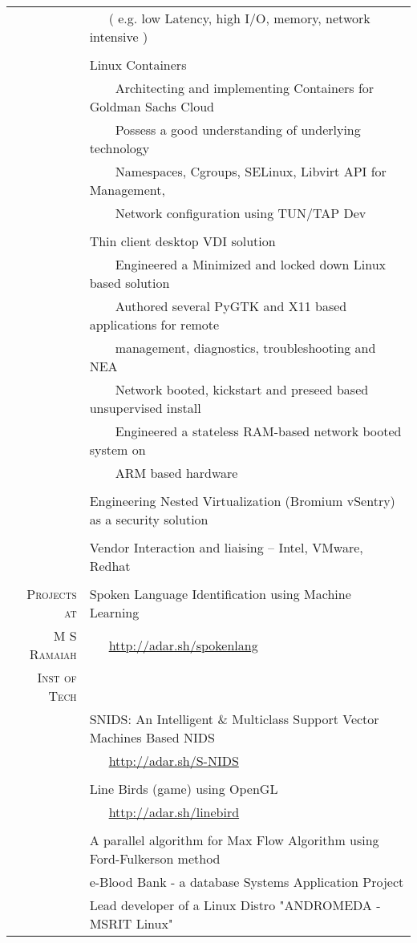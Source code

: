\documentclass[a4paper,10pt]{article} %
\newcommand{\tabitem}{~~\llap{\textbullet}~~}
\begin{document}
\begin{tabular}{rp{12cm}}
& ~~~( e.g. low Latency, high I/O, memory, network intensive )\\
&\\
& Linux Containers\\
& \tabitem Architecting and implementing Containers for Goldman Sachs Cloud \\
& \tabitem Possess a good understanding of underlying technology \\
& ~~~~Namespaces, Cgroups, SELinux, Libvirt API for Management, \\
& ~~~~Network configuration using TUN/TAP Dev\\
&\\
& Thin client desktop VDI solution\\
& \tabitem Engineered a Minimized and locked down Linux based solution \\
& \tabitem Authored several PyGTK and X11 based applications for remote \\
& ~~~~management, diagnostics, troubleshooting and NEA \\
& \tabitem Network booted, kickstart and preseed based unsupervised install \\
& \tabitem Engineered a stateless RAM-based network booted system on\\ & ~~~~ARM based hardware\\
&\\
& Engineering Nested Virtualization (Bromium vSentry) as a security solution\\
& \\
& Vendor Interaction and liaising – Intel, VMware, Redhat \\
&\\
\textsc{Projects at} & Spoken Language Identification using Machine Learning\\ 
\textsc{M S Ramaiah} & ~~~\href{http://adar.sh/spokenlang}{http://adar.sh/spokenlang}  \\
\textsc{Inst of Tech} & \\
& SNIDS: An Intelligent \& Multiclass Support Vector Machines Based NIDS \\ 
& ~~~\href{http://adar.sh/S-NIDS}{http://adar.sh/S-NIDS}  \\
& \\
& Line Birds (game) using OpenGL \\
& ~~~\href{http://adar.sh/linebird}{http://adar.sh/linebird}\\
& \\
& A parallel algorithm for Max Flow Algorithm using Ford-Fulkerson method \\
& e-Blood Bank - a database Systems Application Project \\
& Lead developer of a Linux Distro "ANDROMEDA - MSRIT Linux" \\
\end{tabular}
\end{document}

